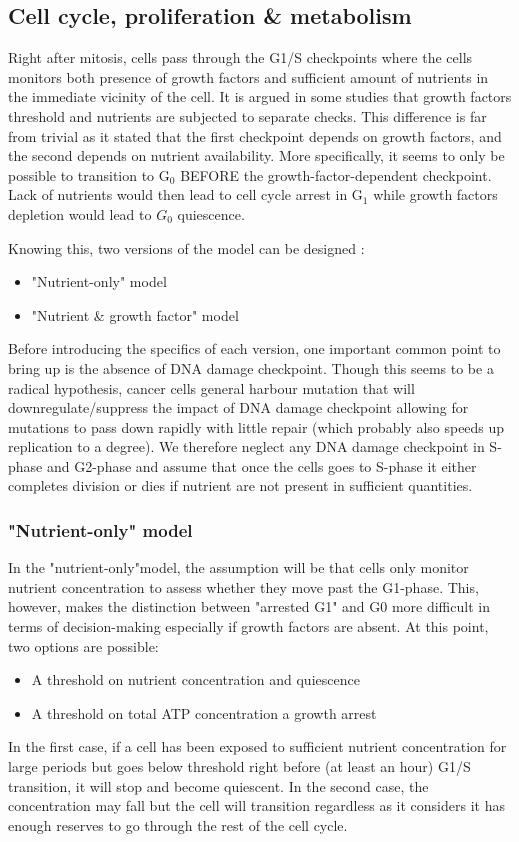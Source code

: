 \documentclass[11pt,a4paper]{article}
\begin{document}
\subsection{Cell cycle, proliferation \& metabolism}
Right after mitosis, cells pass through the  G1/S checkpoints where the cells monitors both presence of growth factors and sufficient amount of nutrients in the immediate vicinity of the cell. It is argued in some studies that growth factors threshold and nutrients are subjected to separate checks.\cite{Zetterberg1996}\cite{Foster2010} This difference is far from trivial as it stated that the first checkpoint depends on growth factors, and the second depends on nutrient availability. More specifically, it seems to only be possible to transition to G$_0$ BEFORE the growth-factor-dependent checkpoint. Lack of nutrients would then lead to cell cycle arrest in G$_1$ while growth factors depletion would lead to $G_0$ quiescence.

Knowing this, two versions of the model can be designed :
\begin{itemize}
\item "Nutrient-only" model 
\item "Nutrient \& growth factor" model
\end{itemize} 

Before introducing the specifics of each version, one important common point to bring up is the absence of DNA damage checkpoint. Though this seems to be a radical hypothesis, cancer cells general harbour mutation that will downregulate/suppress the impact of DNA damage checkpoint allowing for mutations to pass down rapidly with little repair (which probably also speeds up replication to a degree). We therefore neglect any DNA damage checkpoint in S-phase and G2-phase and assume that once the cells  goes to S-phase it either completes division or dies if nutrient are not present in sufficient quantities.

\subsubsection{"Nutrient-only" model}
In the "nutrient-only"model, the assumption will be that cells only monitor nutrient concentration to assess whether they move past the G1-phase. This, however, makes the distinction between "arrested G1" and G0 more difficult in terms of decision-making especially if growth factors are absent. At this point, two options are possible: 

\begin{itemize}
\item A threshold on nutrient concentration and quiescence
\item A threshold on total ATP concentration a growth arrest
\end{itemize} 
In the first case, if a cell has been exposed to sufficient nutrient concentration for large periods but goes below threshold right before (at least an hour) G1/S transition, it will stop and become quiescent. In the second case, the concentration may fall but the cell will transition regardless as it considers it has enough reserves to go through the rest of the cell cycle.
\end{document}
